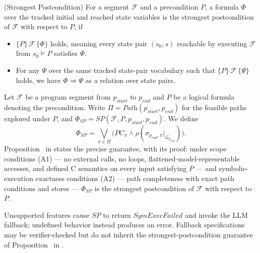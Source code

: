 \begin{definition}{(Strongest Postcondition)}
    For a segment $\mathcal{F}$ and a precondition $P$, {a formula $\Phi$ over the tracked initial and reached state variables} is the strongest postcondition of $\mathcal{F}$ with respect to $P$, if
    \begin{itemize}
        \item $\{P\}\,\mathcal{F}\,\{\Phi\}$ holds, {meaning every state pair $(s_0,s)$ reachable by executing $\mathcal{F}$ from $s_0\models P$ satisfies $\Phi$.}

       \item For any $\Psi$ {over the same tracked state-pair vocabulary} such that $\{P\}\,\mathcal{F}\,\{\Psi\}$ holds, we have $\Phi \Rightarrow \Psi$ {as a relation over state pairs}.
   \end{itemize}
\end{definition}



Let $\mathcal{F}$ be a program segment from $p_{\textit{start}}$ to $p_{\textit{end}}$ and $P$ be a logical formula denoting the precondition. {Write $\Pi=\textit{Path}(p_{\textit{start}},p_{\textit{end}})$ for the feasible paths explored under $P$, and $\Phi_{\mathit{SP}}=\textit{SP}(\mathcal{F},P,p_{\textit{start}},p_{\textit{end}})$. We define}
\[
{\Phi_{\mathit{SP}}
 = \bigvee_{\pi\in\Pi}\bigl(PC_\pi
 \land\rho(\sigma_{p_{\textit{end}},\pi}|_{\mathcal L_{p_{\textit{end}}}})\bigr).}
\]
{Proposition~ in  states the precise guarantee, with its proof: under scope conditions (A1) --- no external calls, no loops, flattened-model-representable accesses, and defined C semantics on every input satisfying $P$ --- and symbolic-execution exactness conditions (A2) --- path completeness with exact path conditions and stores --- $\Phi_{\mathit{SP}}$ is the strongest postcondition of $\mathcal{F}$ with respect to $P$.}


 
Unsupported features cause $\textit{SP}$ to return $\textit{SymExecFailed}$ and invoke the LLM fallback; {undefined behavior instead produces an error.} Fallback specifications may be verifier-checked but do not inherit the strongest-postcondition guarantee of Proposition~ in .

